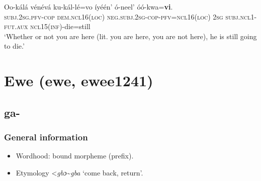 \begin{exe}
	\ex
	\gll Oo-kálá vénévá ku-kál-lé=vo íyéén' ó-neel' óó-kwa=\textbf{vi}.\\
	\textsc{subj}.2\textsc{sg}.\textsc{pfv}-\textsc{cop} \textsc{dem}.\textsc{ncl16}(\textsc{loc}) \textsc{neg}.\textsc{subj}.2\textsc{sg}-\textsc{cop}-\textsc{pfv}=\textsc{ncl}16(\textsc{loc}) 2\textsc{sg} \textsc{subj}.\textsc{ncl}1-\textsc{fut}.\textsc{aux} \textsc{ncl}15(\textsc{inf})-die=still\\
	\glt \lq Whether or not you are here (lit. you are here, you are not here), he is still going to die.' \parencite[190]{Guerois2021}
\end{exe}

\section{Ewe (ewe, ewee1241)}
\subsection{ga-}
\subsubsection{General information}
\begin{itemize}
	\item Wordhood: bound morpheme (prefix).
	\item Etymology <\textit{gbɔ}\sim\textit{gba} \lq come back, return'.
\end{itemize}


